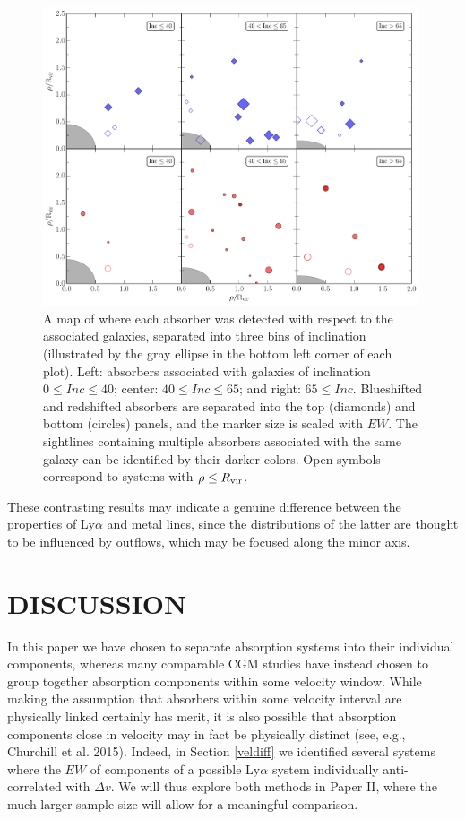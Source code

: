 \begin{figure}[ht!]
        \centering
        \includegraphics[width=0.99\textwidth]{Chap3/figures/fig13.pdf}
        \caption{\small{A map of where each absorber was detected with respect to the associated galaxies, separated into three bins of inclination (illustrated by the gray ellipse in the bottom left corner of each plot). Left: absorbers associated with galaxies of inclination $0 \leq Inc \le 40$; center: $40 \leq Inc \le 65$; and right: $65 \leq Inc$. Blueshifted and redshifted absorbers are separated into the top (diamonds) and bottom (circles) panels, and the marker size is scaled with $EW$. The sightlines containing multiple absorbers associated with the same galaxy can be identified by their darker colors. Open symbols correspond to systems with $\rho \leq R_{\rm vir}$.}}
        \label{azimuthMap}
\end{figure} 

These contrasting results may indicate a genuine difference between the properties of Ly$\alpha$ and metal lines, since the distributions of the latter are thought to be influenced by outflows, which may be focused along the minor axis.


\section{DISCUSSION}


In this paper we have chosen to separate absorption systems into their individual components, whereas many comparable CGM studies have instead chosen to group together absorption components within some velocity window. While making the assumption that absorbers within some velocity interval are physically linked certainly has merit, it is also possible that absorption components close in velocity may in fact be physically distinct (see, e.g., Churchill et al. 2015). Indeed, in Section \ref{veldiff} we identified several systems where the $EW$ of components of a possible Ly$\alpha$ system individually anti-correlated with $\Delta v$. We will thus explore both methods in Paper II, where the much larger sample size will allow for a meaningful comparison.\\

